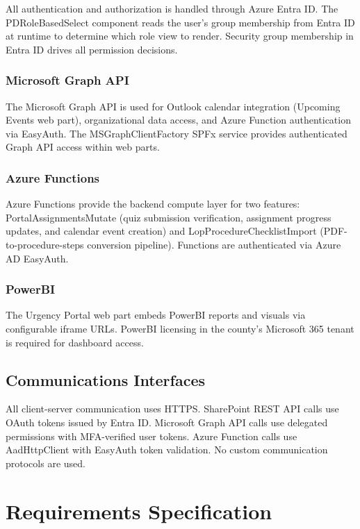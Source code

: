 \documentclass[12pt]{article}
\begin{document}
All authentication and authorization is handled through Azure Entra ID. The PDRoleBasedSelect component reads the user's group membership from Entra ID at runtime to determine which role view to render. Security group membership in Entra ID drives all permission decisions.

\subsubsection{Microsoft Graph API}

The Microsoft Graph API is used for Outlook calendar integration (Upcoming Events web part), organizational data access, and Azure Function authentication via EasyAuth. The MSGraphClientFactory SPFx service provides authenticated Graph API access within web parts.

\subsubsection{Azure Functions}

Azure Functions provide the backend compute layer for two features: PortalAssignmentsMutate (quiz submission verification, assignment progress updates, and calendar event creation) and LopProcedureChecklistImport (PDF-to-procedure-steps conversion pipeline). Functions are authenticated via Azure AD EasyAuth.

\subsubsection{PowerBI}

The Urgency Portal web part embeds PowerBI reports and visuals via configurable iframe URLs. PowerBI licensing in the county's Microsoft 365 tenant is required for dashboard access.

\subsection{Communications Interfaces}

All client-server communication uses HTTPS. SharePoint REST API calls use OAuth tokens issued by Entra ID. Microsoft Graph API calls use delegated permissions with MFA-verified user tokens. Azure Function calls use AadHttpClient with EasyAuth token validation. No custom communication protocols are used.

\section{Requirements Specification}
\end{document}
